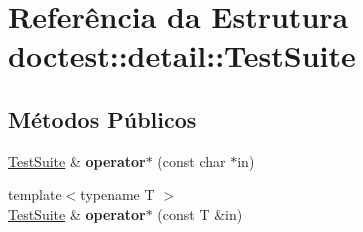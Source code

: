 \hypertarget{structdoctest_1_1detail_1_1TestSuite}{}\section{Referência da Estrutura doctest\+:\+:detail\+:\+:Test\+Suite}
\label{structdoctest_1_1detail_1_1TestSuite}
\subsection*{Métodos Públicos}
\begin{DoxyCompactItemize}
\item 
\mbox{\label{structdoctest_1_1detail_1_1TestSuite_a8fea9c73837193c3a5e2f0829aa5a9cd}} 
\hyperlink{structdoctest_1_1detail_1_1TestSuite}{Test\+Suite} \& {\bfseries operator$\ast$} (const char $\ast$in)
\item 
\mbox{\label{structdoctest_1_1detail_1_1TestSuite_a87a44a0d2e0c4955c64ef5d01f7115d8}} 
{\footnotesize template$<$typename T $>$ }\\\hyperlink{structdoctest_1_1detail_1_1TestSuite}{Test\+Suite} \& {\bfseries operator$\ast$} (const T \&in)
\end{DoxyCompactItemize}
